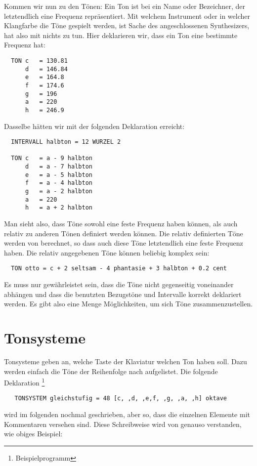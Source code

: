 Kommen wir nun zu den Tönen: Ein Ton ist bei \mutabor{} ein Name oder
Bezeichner, der letztendlich eine Frequenz repräsentiert. Mit welchem
Instrument oder in welcher Klangfarbe die Töne gespielt werden, ist
Sache des angeschlossenen Synthesizers, hat also mit \mutabor{} nichts zu
tun. Hier deklarieren wir, dass ein Ton eine bestimmte Frequenz hat:
\begin{verbatim}
  TON c   = 130.81
      d   = 146.84
      e   = 164.8
      f   = 174.6
      g   = 196
      a   = 220
      h   = 246.9
\end{verbatim}
Dasselbe hätten wir mit der folgenden Deklaration erreicht:
\begin{verbatim}
  INTERVALL halbton = 12 WURZEL 2

  TON c   = a - 9 halbton
      d   = a - 7 halbton
      e   = a - 5 halbton
      f   = a - 4 halbton
      g   = a - 2 halbton
      a   = 220
      h   = a + 2 halbton
\end{verbatim}
Man sieht also, dass Töne sowohl eine feste Frequenz haben
können, als auch relativ zu anderen Tönen definiert werden können.
Die relativ definierten Töne werden von \mutabor{} berechnet,
so dass auch diese Töne letztendlich eine feste Frequenz haben.
Die relativ angegebenen Töne können beliebig komplex sein:
\begin{verbatim}
  TON otto = c + 2 seltsam - 4 phantasie + 3 halbton + 0.2 cent
\end{verbatim}
Es muss nur gewährleistet sein, dass die Töne nicht gegenseitig
voneinander abhängen und dass die benutzten Bezugstöne und
Intervalle korrekt deklariert werden. Es gibt also eine Menge
Möglichkeiten, um sich Töne zusammenzustellen.

\section{Tonsysteme}\label{sec:tonsysteme}
Tonsysteme geben an, welche Taste der Klaviatur welchen Ton haben
soll. Dazu werden einfach die Töne der Reihenfolge nach
aufgelistet. Die folgende Deklaration \footnote{
Beispielprogramm }\label{KOMENTAR}
\begin{verbatim}
   TONSYSTEM gleichstufig = 48 [c, ,d, ,e,f, ,g, ,a, ,h] oktave
\end{verbatim}
wird im folgenden nochmal geschrieben, aber so, dass die einzelnen
Elemente mit Kommentaren versehen sind. Diese Schreibweise wird
von \mutabor{} genauso verstanden, wie obiges Beispiel:


